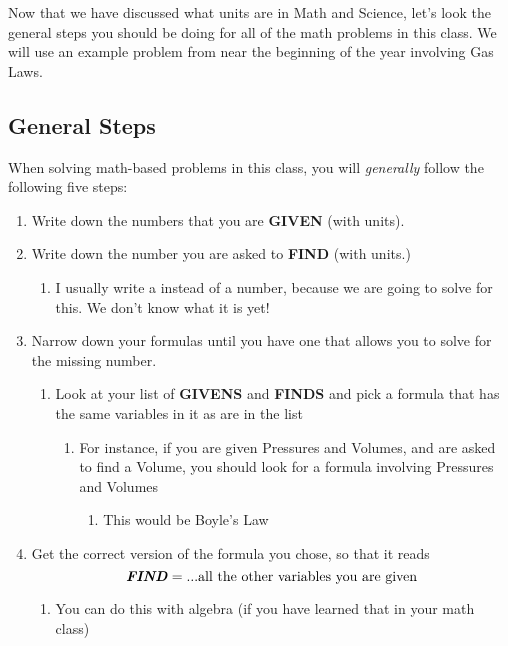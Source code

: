 \documentclass[../../main.tex]{subfiles}
\begin{document}
Now that we have discussed what units are in Math and Science, let's look the general steps you should be doing for all of the math problems in this class.  We will use an example problem from near the beginning of the year involving Gas Laws.


\subsection{General Steps}
When solving math-based problems in this class, you will \emph{generally} follow the following five steps:

 \begin{enumerate}
	\item Write down the numbers that you are \textbf{GIVEN} (with units).
	\item Write down the number you are asked to \textbf{FIND} (with units.)
	      \begin{enumerate}
		      \item I usually write a {\huge\textbf{}} instead of a number, because we are going to solve for this.  We don't know what it is yet!
	      \end{enumerate}
	\item Narrow down your formulas until you have one that allows you to solve for the missing number.
	      \begin{enumerate}
		      \item Look at your list of \textbf{GIVENS} and \textbf{FINDS} and pick a formula that has the same variables in it as are in the list
		            \begin{enumerate}
			            \item For instance, if you are given Pressures and Volumes, and are asked to find a Volume, you should look for a formula involving Pressures and Volumes
			                  \begin{enumerate}
				                  \item This would be Boyle's Law
			                  \end{enumerate}
		            \end{enumerate}
	      \end{enumerate}
	\item Get the correct version of the formula you chose, so that it reads \[\textbf{\emph{FIND}} = ...\text{all the other variables you are given}\]
	      \begin{enumerate}
		      \item You can do this with algebra (if you have learned that in your math class)


\end{enumerate}
\end{enumerate}
\end{document}
